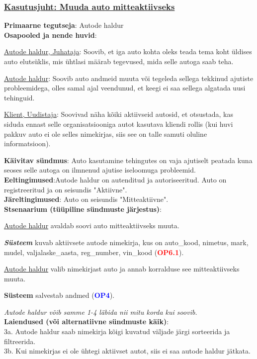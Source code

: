\begin{shaded}
	\subsubsection{\underline{Kasutusjuht: Muuda auto mitteaktiivseks}}
	\textbf{Primaarne tegutseja}: Autode haldur \\
	\textbf{Osapooled ja nende huvid}: 
	\useDash
	\begin{myitemize}
		\item \underline{Autode haldur, Juhataja}: Soovib, et iga auto kohta oleks teada tema koht üldises auto elutsüklis, mis ühtlasi määrab tegevused, mida selle autoga saab teha.
		\item \underline{Autode haldur}: Soovib auto andmeid muuta või tegeleda sellega tekkinud ajutiste probleemidega, olles samal ajal veendunud, et keegi ei saa sellega algatada uusi tehinguid.
		\item \underline{Klient, Uudistaja}: Soovivad näha kõiki aktiivseid autosid, et otsustada, kas siduda ennast selle organisatsiooniga autot kasutava kliendi rollis (kui huvi pakkuv auto ei ole selles nimekirjas, siis see on talle samuti oluline informatsioon).
	\end{myitemize}
	\textbf{Käivitav sündmus}: Auto kasutamine tehingutes on vaja ajutiselt peatada kuna seoses selle autoga on ilmnenud ajutise iseloomuga probleemid. \\
	\textbf{Eeltingimused}:Autode haldur on autenditud ja autoriseeritud. Auto on registreeritud ja on seisundis "Aktiivne".\\
	\textbf{Järeltingimused}: Auto on seisundis "Mitteaktiivne". \\
	\textbf{Stsenaarium (tüüpiline sündmuste järjestus)}:
	\begin{myenumerate}
		\item \underline{Autode haldur} avaldab soovi auto mitteaktiivseks muuta.
		\item\textit \textbf{Süsteem} kuvab aktiivsete autode nimekirja, kus on auto\_kood, nimetus,  mark, mudel, valjalaske\_aasta, reg\_number, vin\_kood (\textbf{\textcolor{red}{OP6.1}}).
		\item \underline{Autode haldur} valib nimekirjast auto ja annab korralduse see mitteaktiivseks muuta.
		\item \textbf{Süsteem} salvestab andmed (\textbf{\textcolor{blue}{OP4}}).
	\end{myenumerate}
	\textit{Autode haldur võib samme 1-4 läbida nii mitu korda kui soovib.} \\
	\textbf{Laiendused  (või alternatiivne sündmuste käik)}: \\
	\indent 3a. Autode haldur saab nimekirja kõigi kuvatud väljade järgi sorteerida ja filtreerida. \\
	\indent 3b. Kui nimekirjas ei ole ühtegi aktiivset autot, siis ei saa autode haldur jätkata.
\end{shaded}

